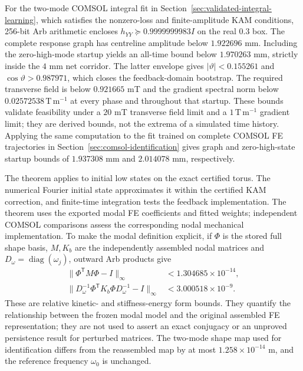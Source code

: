 For the two-mode COMSOL integral fit in
Section~\ref{sec:validated-integral-learning}, which satisfies the
nonzero-loss and finite-amplitude KAM conditions, 256-bit Arb
arithmetic encloses $h_{YY}\succeq0.9999999983I$ on the real $0.3$ box.
The complete response graph has centreline amplitude below $1.922696$ mm.
Including the zero-high-mode startup yields an all-time bound below $1.970263$ mm,
strictly inside the $4$ mm net corridor. The latter envelope gives
$|\vartheta|<0.155261$ and $\cos\vartheta>0.987971$, which closes the
feedback-domain bootstrap. The required transverse field is below
$0.921665$ mT and the gradient spectral norm below
$0.02572538\,\mathrm{T\,m^{-1}}$ at every phase and throughout that
startup. These bounds validate feasibility under a $20$ mT transverse
field limit and a $1\,\mathrm{T\,m^{-1}}$ gradient limit; they are
derived bounds, not the extrema of a simulated time history.
Applying the same computation to the fit trained on complete COMSOL FE
trajectories in Section~\ref{sec:comsol-identification} gives graph and
zero-high-state startup bounds of $1.937308$ mm and $2.014078$ mm,
respectively.

The theorem applies to initial low states on the exact certified torus.
The numerical Fourier initial state approximates it within the
certified KAM correction, and finite-time integration tests the feedback
implementation. The theorem uses the exported modal FE coefficients and
fitted weights; independent COMSOL comparisons assess the corresponding
nodal mechanical implementation.
To make the modal definition explicit, if $\Phi$ is the stored full
shape basis, $M,K_b$ are the independently assembled nodal matrices and
$D_\omega=\operatorname{diag}(\omega_j)$, outward Arb products give
\begin{align}
 \|\Phi^{\mathsf T}M\Phi-I\|_\infty&<1.304685\times10^{-14},\\
 \|D_\omega^{-1}\Phi^{\mathsf T}K_b\Phi D_\omega^{-1}-I\|_\infty
 &<3.000518\times10^{-9}.
\end{align}
These are relative kinetic- and stiffness-energy form bounds. They
quantify the relationship between the frozen modal model and the
original assembled FE representation; they are not used to assert
an exact conjugacy or an unproved persistence result for perturbed
matrices. The two-mode shape map used for identification differs from the
reassembled map by at most $1.258\times10^{-14}$ m, and the reference
frequency $\omega_0$ is unchanged.
